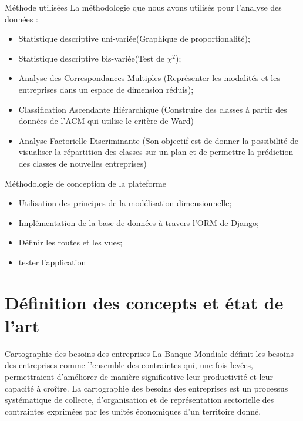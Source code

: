 \documentclass[aspectratio=169, 10pt]{beamer}
\begin{document}
\begin{frame}{Méthode utilisées}
La méthodologie que nous avons utilisés pour l'analyse des données :
\begin{itemize}
	\item Statistique descriptive uni-variée(Graphique de proportionalité);
	\item Statistique descriptive bis-variée(Test de $\chi^2$);
	\item Analyse des Correspondances Multiples (Représenter les modalités et les entreprises dans un espace de dimension réduis);
	\item Classification Ascendante Hiérarchique (Construire des classes à partir des données de l'ACM qui utilise le critère de Ward)
	\item Analyse Factorielle Discriminante (Son objectif est de donner la possibilité de visualiser la répartition des classes sur un plan et de permettre la prédiction des classes de nouvelles entreprises)
\end{itemize}
Méthodologie de conception de la plateforme
\begin{itemize}
	\item Utilisation des principes de la modélisation dimensionnelle;
	\item Implémentation de la base de données à travers l'ORM de Django;
	\item Définir les routes et les vues;
	\item tester l'application
\end{itemize}
\end{frame}

\section{Définition des concepts et état de l'art}

\begin{frame}{Cartographie des besoins des entreprises}
	 La Banque
	Mondiale définit les besoins des entreprises comme l’ensemble des contraintes qui, une fois
	levées, permettraient d’améliorer de manière significative leur productivité et leur capacité à
	croître.
	La cartographie des besoins des entreprises est un processus systématique de collecte,
	d’organisation et de représentation sectorielle des contraintes exprimées par les unités
	économiques d’un territoire donné.
\end{frame}
\end{document}

